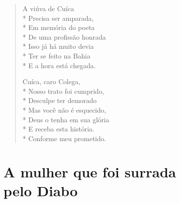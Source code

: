 \begin{verse}
A viúva de Cuíca\\*
Precisa ser amparada,\\*
Em memória do poeta\\*
De uma profissão honrada\\*
Isso já há muito devia\\*
Ter se feito na Bahia\\*
E a hora está chegada.

Cuíca, caro Colega,\\*
Nosso trato foi cumprido,\\*
Desculpe ter demorado\\*
Mas você não é esquecido,\\*
Deus o tenha em sua glória\\*
E receba esta história.\\*
Conforme meu prometido.
\end{verse}

\chapter[A mulher que foi surrada pelo Diabo]{A mulher que foi surrada\\ pelo Diabo}

